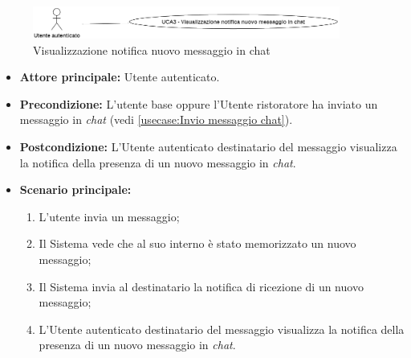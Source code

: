 \label{usecase:Visualizzazione notifica nuovo messaggio in chat}

\begin{figure}[h]
	\centering
	\includegraphics[width=0.9\textwidth]{./uml/UCA3.png} 
	\caption{Visualizzazione notifica nuovo messaggio in chat}
	\label{fig:UCA3}
  \end{figure}

\begin{itemize}
    \item \textbf{Attore principale:} Utente autenticato.
	
	\item \textbf{Precondizione:} L'utente base oppure l'Utente ristoratore ha inviato un messaggio in \textit{chat} (vedi \autoref{usecase:Invio messaggio chat}).

	\item \textbf{Postcondizione:} L'Utente autenticato destinatario del messaggio visualizza la notifica della presenza di un nuovo messaggio in \textit{chat}.
     
	\item \textbf{Scenario principale:}
	      \begin{enumerate}
                \item L'utente invia un messaggio;
                \item Il Sistema vede che al suo interno è stato memorizzato un nuovo messaggio;
                \item Il Sistema invia al destinatario la notifica di ricezione di un nuovo messaggio;
                \item L'Utente autenticato destinatario del messaggio visualizza la notifica della presenza di un nuovo messaggio in \textit{chat}.
	      \end{enumerate}
\end{itemize}